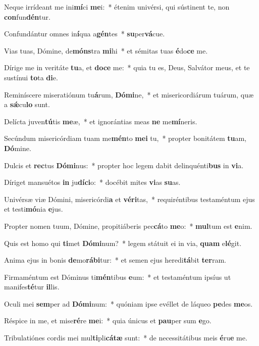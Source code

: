 \item Neque irrídeant me ini\textbf{mí}ci \textbf{me}i:~* étenim univérsi, qui sústinent te, non \textbf{con}fun\textbf{dén}tur.
\item Confundántur omnes in\textbf{í}qua a\textbf{gén}tes~* \textbf{su}per\textbf{vá}cue.
\item Vias tuas, Dómine, de\textbf{móns}tra \textbf{mi}hi~* et sémitas tuas \textbf{é}do\textbf{ce} me.
\item Dírige me in veritáte \textbf{tu}a, et \textbf{do}\textbf{ce} me:~* quia tu es, Deus, Salvátor meus, et te sustínui \textbf{to}ta \textbf{di}e.
\item Reminíscere miseratiónum tu\textbf{á}rum, \textbf{Dó}\textbf{mi}ne,~* et misericordiárum tuárum, quæ a \textbf{sǽ}cu\textbf{lo} sunt.
\item Delícta juven\textbf{tú}tis \textbf{me}æ,~* et ignorántias meas \textbf{ne} me\textbf{mí}neris.
\item Secúndum misericórdiam tuam me\textbf{mén}to \textbf{me}\textbf{i} tu,~* propter bonitátem \textbf{tu}am, \textbf{Dó}mine.
\item Dulcis et \textbf{rec}tus \textbf{Dó}\textbf{mi}nus:~* propter hoc legem dabit delinquénti\textbf{bus} in \textbf{vi}a.
\item Díriget mansuétos \textbf{in} ju\textbf{dí}\textbf{ci}o:~* docébit mites \textbf{vi}as \textbf{su}as.
\item Univérsæ viæ Dómini, misericórdi\textbf{a} et \textbf{vé}\textbf{ri}tas,~* requiréntibus testaméntum ejus et testi\textbf{mó}nia \textbf{e}jus.
\item Propter nomen tuum, Dómine, propitiáberis pec\textbf{cá}to \textbf{me}o:~* \textbf{mul}tum est \textbf{e}nim.
\item Quis est homo qui \textbf{ti}met \textbf{Dó}\textbf{mi}num?~* legem státuit ei in via, \textbf{quam} e\textbf{lé}git.
\item Anima ejus in bonis \textbf{de}mo\textbf{rá}\textbf{bi}tur:~* et semen ejus heredi\textbf{tá}bit \textbf{ter}ram.
\item Firmaméntum est Dóminus ti\textbf{mén}tibus \textbf{e}um:~* et testaméntum ipsíus ut manifes\textbf{té}tur \textbf{il}lis.
\item Oculi mei \textbf{sem}per ad \textbf{Dó}\textbf{mi}num:~* quóniam ipse evéllet de láqueo \textbf{pe}des \textbf{me}os.
\item Réspice in me, et mise\textbf{ré}re \textbf{me}i:~* quia únicus et \textbf{pau}per sum \textbf{e}go.
\item Tribulatiónes cordis mei mul\textbf{ti}pli\textbf{cá}\textbf{tæ} sunt:~* de necessitátibus meis \textbf{é}ru\textbf{e} me.
